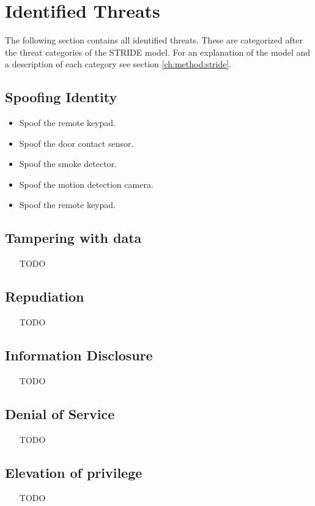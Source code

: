 \section{Identified Threats} \label{ch:threat-model:threats}
The following section contains all identified threats. These are categorized after the threat categories of the STRIDE model. For an explanation of the model and a description of each category see section \ref{ch:method:stride}.

\subsection{Spoofing Identity}
\begin{itemize}
    \item Spoof the remote keypad.
    \item Spoof the door contact sensor.
    \item Spoof the smoke detector.
    \item Spoof the motion detection camera.
    \item Spoof the remote keypad.
\end{itemize}

\subsection{Tampering with data}
\begin{itemize}
    \item [TODO]
\end{itemize}

\subsection{Repudiation}
\begin{itemize}
    \item [TODO]
\end{itemize}

\subsection{Information Disclosure}
\begin{itemize}
    \item [TODO]
\end{itemize}

\subsection{Denial of Service}
\begin{itemize}
    \item [TODO]
\end{itemize}

\subsection{Elevation of privilege}
\begin{itemize}
    \item [TODO]
\end{itemize}
